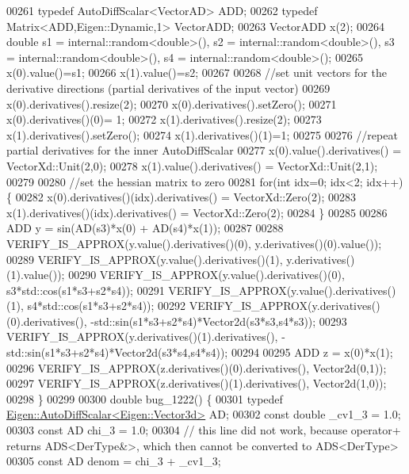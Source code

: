 \begin{DoxyCode}
00261   \textcolor{keyword}{typedef} AutoDiffScalar<VectorAD> ADD;
00262   \textcolor{keyword}{typedef} Matrix<ADD,Eigen::Dynamic,1> VectorADD;
00263   VectorADD x(2);
00264   \textcolor{keywordtype}{double} s1 = internal::random<double>(), s2 = internal::random<double>(), s3 = internal::random<double>(),
       s4 = internal::random<double>();
00265   x(0).value()=s1;
00266   x(1).value()=s2;
00267 
00268   \textcolor{comment}{//set unit vectors for the derivative directions (partial derivatives of the input vector)}
00269   x(0).derivatives().resize(2);
00270   x(0).derivatives().setZero();
00271   x(0).derivatives()(0)= 1;
00272   x(1).derivatives().resize(2);
00273   x(1).derivatives().setZero();
00274   x(1).derivatives()(1)=1;
00275 
00276   \textcolor{comment}{//repeat partial derivatives for the inner AutoDiffScalar}
00277   x(0).value().derivatives() = VectorXd::Unit(2,0);
00278   x(1).value().derivatives() = VectorXd::Unit(2,1);
00279 
00280   \textcolor{comment}{//set the hessian matrix to zero}
00281   \textcolor{keywordflow}{for}(\textcolor{keywordtype}{int} idx=0; idx<2; idx++) \{
00282       x(0).derivatives()(idx).derivatives()  = VectorXd::Zero(2);
00283       x(1).derivatives()(idx).derivatives()  = VectorXd::Zero(2);
00284   \}
00285 
00286   ADD y = sin(AD(s3)*x(0) + AD(s4)*x(1));
00287 
00288   VERIFY\_IS\_APPROX(y.value().derivatives()(0), y.derivatives()(0).value());
00289   VERIFY\_IS\_APPROX(y.value().derivatives()(1), y.derivatives()(1).value());
00290   VERIFY\_IS\_APPROX(y.value().derivatives()(0), s3*std::cos(s1*s3+s2*s4));
00291   VERIFY\_IS\_APPROX(y.value().derivatives()(1), s4*std::cos(s1*s3+s2*s4));
00292   VERIFY\_IS\_APPROX(y.derivatives()(0).derivatives(), -std::sin(s1*s3+s2*s4)*Vector2d(s3*s3,s4*s3));
00293   VERIFY\_IS\_APPROX(y.derivatives()(1).derivatives(),  -std::sin(s1*s3+s2*s4)*Vector2d(s3*s4,s4*s4));
00294 
00295   ADD z = x(0)*x(1);
00296   VERIFY\_IS\_APPROX(z.derivatives()(0).derivatives(), Vector2d(0,1));
00297   VERIFY\_IS\_APPROX(z.derivatives()(1).derivatives(), Vector2d(1,0));
00298 \}
00299 
00300 \textcolor{keywordtype}{double} bug\_1222() \{
00301   \textcolor{keyword}{typedef} \hyperlink{class_eigen_1_1_auto_diff_scalar}{Eigen::AutoDiffScalar<Eigen::Vector3d>} AD;
00302   \textcolor{keyword}{const} \textcolor{keywordtype}{double} \_cv1\_3 = 1.0;
00303   \textcolor{keyword}{const} AD chi\_3 = 1.0;
00304   \textcolor{comment}{// this line did not work, because operator+ returns ADS<DerType&>, which then cannot be converted to
       ADS<DerType>}
00305   \textcolor{keyword}{const} AD denom = chi\_3 + \_cv1\_3;

\end{DoxyCode}
